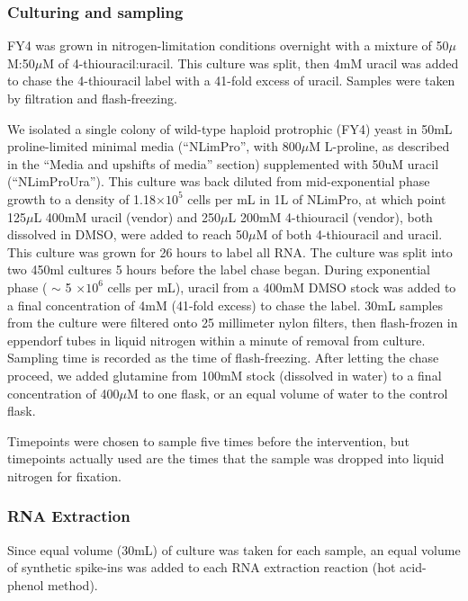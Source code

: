 \subsubsection{Culturing and sampling}\label{culturing-and-sampling}

FY4 was grown in nitrogen-limitation conditions overnight with a mixture
of 50\(\mu\)M:50\(\mu\)M of 4-thiouracil:uracil. This culture was split,
then 4mM uracil was added to chase the 4-thiouracil label with a 41-fold
excess of uracil. Samples were taken by filtration and flash-freezing.

We isolated a single colony of wild-type haploid protrophic (FY4) yeast
in 50mL proline-limited minimal media (``NLimPro'', with 800\(\mu\)M
L-proline, as described in the ``Media and upshifts of media'' section)
supplemented with 50uM uracil (``NLimProUra''). This culture was back
diluted from mid-exponential phase growth to a density of
1.18\(\times 10^5\) cells per mL in 1L of NLimPro, at which point
125\(\mu\)L 400mM uracil (vendor) and 250\(\mu\)L 200mM 4-thiouracil
(vendor), both dissolved in DMSO, were added to reach 50\(\mu\)M of both
4-thiouracil and uracil. This culture was grown for 26 hours to label
all RNA. The culture was split into two 450ml cultures 5 hours before
the label chase began. During exponential phase ( \(\sim\) 5
\(\times 10^6\) cells per mL), uracil from a 400mM DMSO stock was added
to a final concentration of 4mM (41-fold excess) to chase the label.
30mL samples from the culture were filtered onto 25 millimeter nylon
filters, then flash-frozen in eppendorf tubes in liquid nitrogen within
a minute of removal from culture. Sampling time is recorded as the time
of flash-freezing. After letting the chase proceed, we added glutamine
from 100mM stock (dissolved in water) to a final concentration of
400\(\mu\)M to one flask, or an equal volume of water to the control
flask.

Timepoints were chosen to sample five times before the intervention,
but timepoints actually used are the times that the sample was dropped
into liquid nitrogen for fixation.

\subsubsection{RNA Extraction}

Since equal volume (30mL) of culture was taken for each sample, an equal
volume of synthetic spike-ins was added to each RNA extraction reaction
(hot acid-phenol method).

